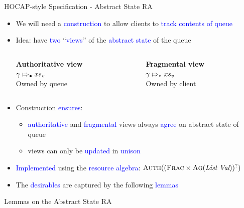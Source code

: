 \documentclass[9pt,xcolor={dvipsnames}]{beamer}
\newcommand{\absvalueList}{xs_v}
\newcommand{\abstractstatefullfrag}[2]{#1 \Mapsto_{\circ} #2}
\newcommand{\abstractstateauth}[2]{#1 \Mapsto_{\bullet} #2}
\begin{document}
\begin{frame}{HOCAP-style Specification - Abstract State RA}
  \begin{itemize}
    \item We will need a \textcolor{blue}{construction} to allow clients to \textcolor{blue}{track contents of queue}
    \pause
    \item Idea: have \textcolor{blue}{two} ``\textcolor{blue}{views}'' of the \textcolor{blue}{abstract state} of the queue
    \begin{columns}
      \begin{column}{0.5\textwidth}
        \begin{center}
          \textbf{Authoritative view}\\
          $\abstractstateauth{\gname}{\absvalueList}$\\
          Owned by queue\\
        \end{center}
      \end{column}
      \begin{column}{0.5\textwidth}
        \begin{center}
          \textbf{Fragmental view}\\
          $\abstractstatefullfrag{\gname}{\absvalueList}$\\
          Owned by client\\
        \end{center}
      \end{column}
    \end{columns}
    \pause
    \item Construction \textcolor{blue}{ensures}:
      \begin{itemize}
        \item \textcolor{blue}{authoritative} and \textcolor{blue}{fragmental} views always \textcolor{blue}{agree} on abstract state of queue
        \item views can only be \textcolor{blue}{updated} in \textcolor{blue}{unison}
      \end{itemize}
    \item \textcolor{blue}{Implemented} using the \textcolor{blue}{resource algebra}: $\textsc{Auth}((\textsc{Frac} \times \textsc{Ag}(\textit{List} ~ \textit{Val}))^?)$
    \item The \textcolor{blue}{desirables} are captured by the following \textcolor{blue}{lemmas}
  \end{itemize}
  \begin{block}{Lemmas on the Abstract State RA}

\end{block}
\end{frame}
\end{document}
